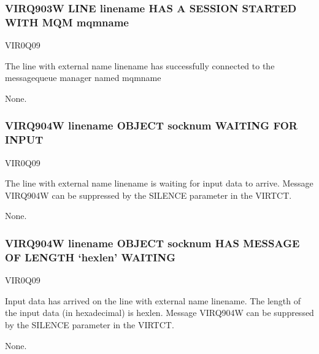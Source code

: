 \documentclass[letterpaper,10pt,english]{sphinxmanual}
\begin{document}
\subsubsection{VIRQ903W LINE linename HAS A SESSION STARTED WITH MQM mqmname}
\label{\detokenize{messages:virq903w-line-linename-has-a-session-started-with-mqm-mqmname}}\begin{description}
\sphinxAtStartPar
VIR0Q09

\sphinxAtStartPar
The line with external name linename has successfully connected to the message\sphinxhyphen{}queue manager named mqmname

\sphinxAtStartPar
None.

\end{description}


\subsubsection{VIRQ904W linename OBJECT socknum WAITING FOR INPUT}
\label{\detokenize{messages:virq904w-linename-object-socknum-waiting-for-input}}\begin{description}
\sphinxAtStartPar
VIR0Q09

\sphinxAtStartPar
The line with external name linename is waiting for input data to arrive. Message VIRQ904W can be suppressed by the SILENCE parameter in the VIRTCT.

\sphinxAtStartPar
None.

\end{description}


\subsubsection{VIRQ904W linename OBJECT socknum HAS MESSAGE OF LENGTH ‘hexlen’ WAITING}
\label{\detokenize{messages:virq904w-linename-object-socknum-has-message-of-length-hexlen-waiting}}\begin{description}
\sphinxAtStartPar
VIR0Q09

\sphinxAtStartPar
Input data has arrived on the line with external name linename. The length of the input data (in hexadecimal) is hexlen. Message VIRQ904W can be suppressed by the SILENCE parameter in the VIRTCT.

\sphinxAtStartPar
None.

\end{description}
\end{document}
